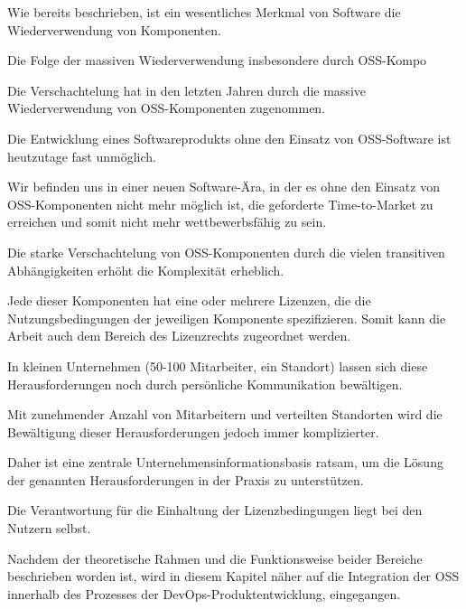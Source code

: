 Wie bereits beschrieben, ist ein wesentliches Merkmal von Software die Wiederverwendung von Komponenten. 

Die Folge der massiven Wiederverwendung insbesondere durch OSS-Kompo

Die Verschachtelung hat in den letzten Jahren durch die massive Wiederverwendung von OSS-Komponenten zugenommen. 

Die Entwicklung eines Softwareprodukts ohne den Einsatz von OSS-Software ist heutzutage fast unmöglich. 

Wir befinden uns in einer neuen Software-Ära, in der es ohne den Einsatz von OSS-Komponenten nicht mehr möglich ist, die geforderte Time-to-Market zu erreichen und somit nicht mehr wettbewerbsfähig zu sein. 

Die starke Verschachtelung von OSS-Komponenten durch die vielen transitiven Abhängigkeiten erhöht die Komplexität erheblich. 

Jede dieser Komponenten hat eine oder mehrere Lizenzen, die die Nutzungsbedingungen der jeweiligen Komponente spezifizieren. Somit kann die Arbeit auch dem Bereich des Lizenzrechts zugeordnet werden.

In kleinen Unternehmen (50-100 Mitarbeiter, ein Standort) lassen sich diese Herausforderungen noch durch persönliche Kommunikation bewältigen. 

Mit zunehmender Anzahl von Mitarbeitern und verteilten Standorten wird die Bewältigung dieser Herausforderungen jedoch immer komplizierter. 

Daher ist eine zentrale Unternehmensinformationsbasis ratsam, um die Lösung der genannten Herausforderungen in der Praxis zu unterstützen.

Die Verantwortung für die Einhaltung der Lizenzbedingungen liegt bei den Nutzern selbst.



Nachdem der theoretische Rahmen und die Funktionsweise beider Bereiche beschrieben worden ist, wird in diesem Kapitel näher auf die Integration der OSS innerhalb des Prozesses der DevOps-Produktentwicklung, eingegangen.